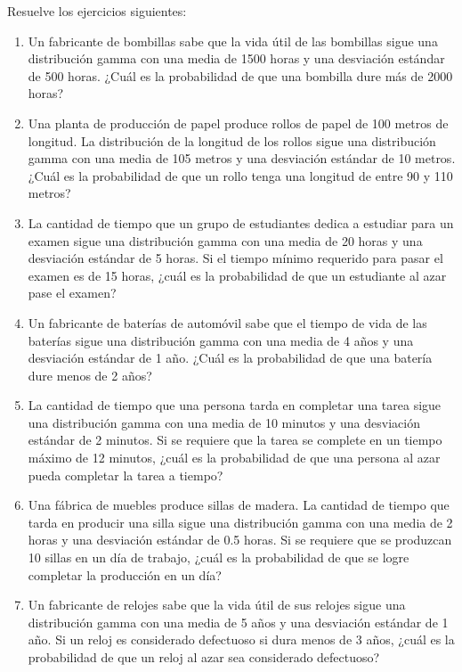 \begin{Ejer}
Resuelve los ejercicios siguientes:

\begin{enumerate}
    \item Un fabricante de bombillas sabe que la vida útil de las bombillas sigue una distribución gamma con una media de 1500 horas y una desviación estándar de 500 horas. ¿Cuál es la probabilidad de que una bombilla dure más de 2000 horas?

    \item Una planta de producción de papel produce rollos de papel de 100 metros de longitud. La distribución de la longitud de los rollos sigue una distribución gamma con una media de 105 metros y una desviación estándar de 10 metros. ¿Cuál es la probabilidad de que un rollo tenga una longitud de entre 90 y 110 metros?

    \item La cantidad de tiempo que un grupo de estudiantes dedica a estudiar para un examen sigue una distribución gamma con una media de 20 horas y una desviación estándar de 5 horas. Si el tiempo mínimo requerido para pasar el examen es de 15 horas, ¿cuál es la probabilidad de que un estudiante al azar pase el examen?

    \item Un fabricante de baterías de automóvil sabe que el tiempo de vida de las baterías sigue una distribución gamma con una media de 4 años y una desviación estándar de 1 año. ¿Cuál es la probabilidad de que una batería dure menos de 2 años?

    \item La cantidad de tiempo que una persona tarda en completar una tarea sigue una distribución gamma con una media de 10 minutos y una desviación estándar de 2 minutos. Si se requiere que la tarea se complete en un tiempo máximo de 12 minutos, ¿cuál es la probabilidad de que una persona al azar pueda completar la tarea a tiempo?

    \item Una fábrica de muebles produce sillas de madera. La cantidad de tiempo que tarda en producir una silla sigue una distribución gamma con una media de 2 horas y una desviación estándar de 0.5 horas. Si se requiere que se produzcan 10 sillas en un día de trabajo, ¿cuál es la probabilidad de que se logre completar la producción en un día?

    \item Un fabricante de relojes sabe que la vida útil de sus relojes sigue una distribución gamma con una media de 5 años y una desviación estándar de 1 año. Si un reloj es considerado defectuoso si dura menos de 3 años, ¿cuál es la probabilidad de que un reloj al azar sea considerado defectuoso?


\end{enumerate}
\end{Ejer}
